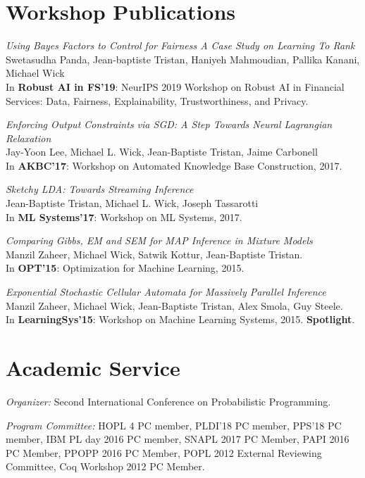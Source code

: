 \documentclass[margin,line]{res}
\begin{document}
\begin{resume}
\section{\sc Workshop Publications}

\emph{Using Bayes Factors to Control for Fairness A Case Study on Learning To Rank}\\
Swetasudha Panda, Jean-baptiste Tristan, Haniyeh Mahmoudian, Pallika Kanani, Michael Wick\\
In {\bf Robust AI in FS'19}: NeurIPS 2019 Workshop on Robust AI in Financial Services: Data, Fairness, Explainability, Trustworthiness, and Privacy.

\emph{Enforcing Output Constraints via SGD: A Step Towards Neural Lagrangian Relaxation}\\
Jay-Yoon Lee, Michael L. Wick, Jean-Baptiste Tristan, Jaime Carbonell\\
In {\bf AKBC'17}: Workshop on Automated Knowledge Base Construction, 2017.

\emph{Sketchy LDA: Towards Streaming Inference}\\
Jean-Baptiste Tristan, Michael L. Wick, Joseph Tassarotti\\
In {\bf ML Systems'17}: Workshop on ML Systems, 2017.


\emph{Comparing Gibbs, EM and SEM for MAP Inference in Mixture Models}\\
Manzil Zaheer, Michael Wick, Satwik Kottur, Jean-Baptiste Tristan.\\
In {\bf OPT'15}: Optimization for Machine Learning, 2015. 

\emph{Exponential Stochastic Cellular Automata for Massively Parallel Inference}\\
Manzil Zaheer, Michael Wick, Jean-Baptiste Tristan, Alex Smola, Guy Steele.\\
In {\bf LearningSys'15}: Workshop on Machine Learning Systems, 2015. {\bf Spotlight}. 

\section{\sc Academic Service}

{\em Organizer:} Second International Conference on Probabilistic Programming.

{\em Program Committee:} HOPL 4 PC member, PLDI'18 PC member, PPS'18 PC member, IBM PL day 2016 PC member, SNAPL 2017 PC Member, PAPI 2016 PC Member, PPOPP 2016 PC Member, POPL 2012 External Reviewing Committee, Coq Workshop 2012 PC Member.


\end{resume}
\end{document}
